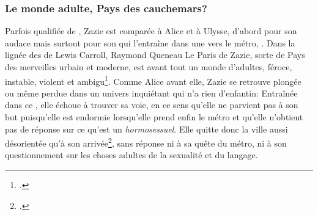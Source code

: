 \subsubsection{Le monde adulte, Pays des cauchemars?}
Parfois qualifiée de , Zazie est comparée à Alice et à Ulysse, d'abord pour son audace mais surtout pour son  qui l'entraîne dans une  vers le métro, .
Dans la lignée des  de Lewis Carroll, Raymond Queneau 
Le Paris de Zazie, sorte de Pays des merveilles urbain et moderne, est avant tout un monde d'adultes, féroce, instable, violent et ambigu\footcite[113]{Pestureau1983}.
Comme Alice avant elle, Zazie se retrouve plongée ou même perdue dans un univers inquiétant qui n'a rien d'enfantin: 
Entraînée dans ce , elle échoue à trouver sa voie, en ce sens qu'elle ne parvient pas à son but puisqu'elle est endormie lorsqu'elle prend enfin le métro et qu'elle n'obtient pas de réponse sur ce qu'est un \textit{hormosessuel}.
Elle quitte donc la ville aussi désorientée qu'à son arrivée\footcite[119]{Bernofsky1994}, sans réponse ni à sa quête du métro, ni à son questionnement sur les choses adultes de la sexualité et du langage.

